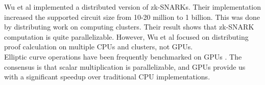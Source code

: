 Wu et al \cite{wu2018dizk} implemented a distributed version of zk-SNARKs. Their implementation increased the supported circuit size from 10-20 million to 1 billion. This was done by distributing work on computing clusters. Their result shows that zk-SNARK computation is quite parallelizable. However, Wu et al focused on distributing proof calculation on multiple CPUs and clusters, not GPUs.
\\
Elliptic curve operations have been frequently benchmarked on GPUs \cite{mahefast, bernstein2010ecc2k, antao2010elliptic}. The consensus is that scalar multiplication is parallelizable, and GPUs provide us with a significant speedup over traditional CPU implementations.